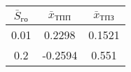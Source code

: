 \begin{tabular}{|c|c|c|}
\hline
$\bar{S}_{го}$ & $\bar{x}_{ТПП}$ & $\bar{x}_{ТПЗ}$ \\ 
\hline
0.01 & 0.2298 & 0.1521 \\ 
\hline
0.2 & -0.2594 & 0.551 \\ 
\hline
\end{tabular}